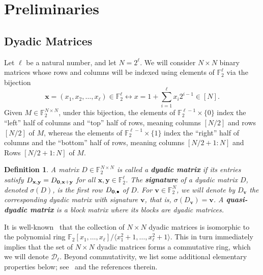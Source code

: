 \documentclass[11pt]{article}
\newtheorem{definition}[lemma]{Definition}
\theoremstyle{plain}
\theoremstyle{plain}
\theoremstyle{definition}
\numberwithin{theo}{section}
\newcommand{\F}{{\mathbb F}}
\newcommand{\cD}{{\mathcal D}}
\newcommand{\bv}{{\mathbf v}}
\newcommand{\bx}{{\mathbf x}}
\newcommand{\by}{{\mathbf y}}
\def\s{\sigma}
\begin{document}
\section{Preliminaries}
\label{sec:preliminaries}

\subsection{Dyadic Matrices}
Let $\ell$ be a natural number, and let $N = 2^\ell$. We will consider $N \times N$ binary matrices whose rows and columns will be indexed using elements of $\F_2^\ell$ via the bijection 
\begin{equation}\label{e-bijection}
\bx = (x_1,x_2,\ldots,x_{\ell})\in \F_2^\ell \leftrightarrow x = 1+\sum_{i=1}^\ell x_i 2^{i-1} \in [N].  
\end{equation}
Given $M \in \F_2^{N \times N}$,
under this bijection, the elements of $\F_2^{\ell-1}\times \{0\}$ index the ``left'' half of columns and  ``top'' half of rows, meaning columns $[N/2]$ and rows $[N/2]$ of $M$,  whereas the elements of $\F_2^{\ell-1}\times \{1\}$ index the ``right'' half of columns and the ``bottom'' half of rows, meaning columns $[N/2+1:N]$ and Rows $[N/2+1:N]$ of $M$. 
\begin{definition}
\label{definition_dyadic_matrix}
A matrix $D\in \F_2^{N\times N}$ is called a {\bf dyadic matrix} if its entries satisfy $D_{\bx,\by} = D_{{\bf 0},\bx+\by}$ for all $\bx, \by \in \F_2^\ell$.
The {\bf signature} of a dyadic matrix $D$, denoted $\s(D)$, is the first row $D_{{\bf 0},\bullet}$ of $D$. For $\bv \in \F_2^N$, we will denote by $D_\bv$ the corresponding dyadic matrix with signature $\bv$, that is, $\s(D_\bv) = \bv$.
A \textbf{quasi-dyadic matrix} is a block matrix where its blocks are dyadic matrices.
\end{definition}
It is well-known~\cite{Gulamhusein} that the collection of $N\times N$ dyadic matrices is isomorphic to the polynomial ring $\F_2[x_1,\ldots,x_\ell]/\langle x_1^2+1,\ldots,x_\ell^2+1\rangle$. This in turn immediately implies that the set of $N \times N$ dyadic matrices forms a commutative ring, which we will denote $\cD_\ell$. 
Beyond commutativity, we list some additional elementary properties below; see~\cite{mpk24} and the references therein.
\end{document}
